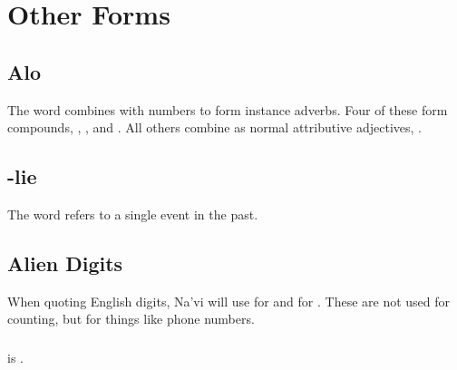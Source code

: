 \section{Other Forms}

\subsection{Alo} The word   combines with
numbers to form instance adverbs.  Four of these form compounds,
 ,  , 
 and  .
All others combine as normal attributive adjectives,  . 

\subsection{-lie} The word  refers to a single event
in the past. 

\subsection{Alien Digits} When quoting English digits, Na'vi will use
 for  and  for .  These are not used
for counting, but for things like phone numbers.

\subsubsection{}  is .  
